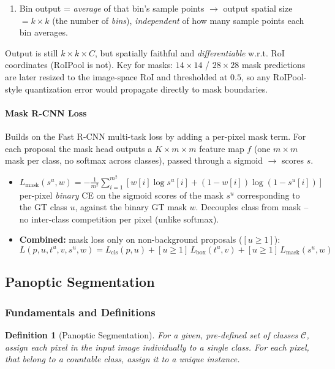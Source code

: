 \documentclass{article}
\newtheorem{definition}{Definition}
\begin{document}
\begin{itemize}
\begin{enumerate}
        \item Bin output = \textit{average} of that bin's sample points $\rightarrow$ output spatial size $= k\times k$ (the number of \textit{bins}), \textit{independent} of how many sample points each bin averages.
    \end{enumerate}
    Output is still $k\times k\times C$, but spatially faithful and \textit{differentiable} w.r.t. RoI coordinates (RoIPool is not). Key for masks: $14\times 14$ / $28\times 28$ mask predictions are later resized to the image-space RoI and thresholded at $0.5$, so any RoIPool-style quantization error would propagate directly to mask boundaries.
\end{itemize}

\paragraph{Mask R-CNN Loss}
Builds on the Fast R-CNN multi-task loss by adding a per-pixel mask term. For each proposal the mask head outputs a $K \times m \times m$ feature map $f$ (one $m\times m$ mask per class, no softmax across classes), passed through a sigmoid $\rightarrow$ scores $s$.
\begin{itemize}
    \item $L_\text{mask}(s^u, w) = -\frac{1}{m^2} \sum_{i=1}^{m^2} \left[ w[i] \log s^u[i] + (1 - w[i]) \log(1 - s^u[i]) \right] \qquad$ per-pixel \textit{binary} CE on the sigmoid scores of the mask $s^u$ corresponding to the GT class $u$, against the binary GT mask $w$. Decouples class from mask -- no inter-class competition per pixel (unlike softmax).
    \item \textbf{Combined:} mask loss only on non-background proposals ($[u\geq 1]$):
    $$
    L(p, u, t^u, v, s^u, w) = L_\text{cls}(p, u) + [u\geq 1]\, L_\text{box}(t^u, v) + [u\geq 1]\, L_\text{mask}(s^u, w)
    $$
\end{itemize}


\subsection{Panoptic Segmentation}
\subsubsection{Fundamentals and Definitions}
\begin{definition}[Panoptic Segmentation]
    For a given, pre-defined set of classes $\mathcal{C}$, assign each pixel in the input image individually to a single class. For each pixel, that belong to a countable class, assign it to a unique instance.
\end{definition}
\end{document}

